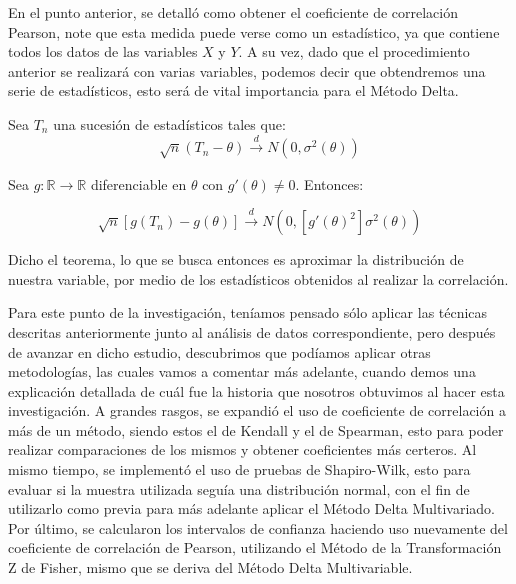 \begin{enumerate}
    En el punto anterior, se detalló como obtener el coeficiente de correlación Pearson, note que esta medida puede verse como un estadístico, ya que contiene todos los datos de las variables $X$ y $Y$. A su vez, dado que el procedimiento anterior se realizará con varias variables, podemos decir que obtendremos una serie de estadísticos, esto será de vital importancia para el Método Delta. \\

    \begin{theorem} 
    Sea $T_n$ una sucesión de estadísticos tales que:
        \begin{equation*}
            \sqrt{n}(T_n - \theta) \xrightarrow[]{d} N(0, \sigma^2(\theta))
        \end{equation*}

    Sea $g: \mathbb{R} \longrightarrow \mathbb{R}$ diferenciable en $\theta$ con $g'(\theta) \neq 0$. Entonces:

        \begin{equation}
            \sqrt{n}[g(T_n) - g(\theta)] \xrightarrow[]{d} N(0, [g'(\theta)^2]\sigma^2(\theta))
        \end{equation}
    \end{theorem}

    Dicho el teorema, lo que se busca entonces es aproximar la distribución de nuestra variable, por medio de los estadísticos obtenidos al realizar la correlación. 
\end{enumerate}

Para este punto de la investigación, teníamos pensado sólo aplicar las técnicas descritas anteriormente junto al análisis de datos correspondiente, pero después de avanzar en dicho estudio, descubrimos que podíamos aplicar otras metodologías, las cuales vamos a comentar más adelante, cuando demos una explicación detallada de cuál fue la historia que nosotros obtuvimos al hacer esta investigación. A grandes rasgos, se expandió el uso de coeficiente de correlación a más de un método, siendo estos el de Kendall y el de Spearman, esto para poder realizar comparaciones de los mismos y obtener coeficientes más certeros. Al mismo tiempo, se implementó el uso de pruebas de Shapiro-Wilk, esto para evaluar si la muestra utilizada seguía una distribución normal, con el fin de utilizarlo como previa para más adelante aplicar el Método Delta Multivariado. Por último, se calcularon los intervalos de confianza haciendo uso nuevamente del coeficiente de correlación de Pearson, utilizando el Método de la Transformación Z de Fisher, mismo que se deriva del Método Delta Multivariable.\\

